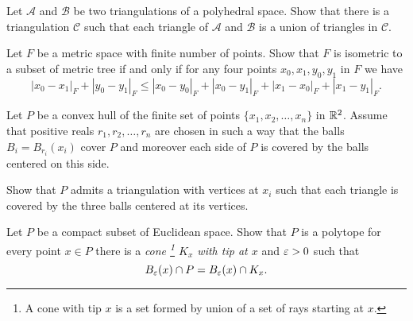 \begin{pr}\label{pr:2-triangulations}
Let $\mathcal{A}$ and $\mathcal{B}$ be two triangulations of a polyhedral space.
Show that there is a triangulation $\mathcal{C}$ such that each triangle of $\mathcal{A}$ and $\mathcal{B}$ is a union of triangles in $\mathcal{C}$.
\end{pr}

\begin{pr}
Let $F$ be a metric space with finite number of points.
Show that $F$ is isometric to a subset of metric tree if and only if
for any four points $x_0,x_1,y_0,y_1$ in $F$
we have 
$$|x_0-x_1|_F+|y_0-y_1|_F
\le
|x_0-y_0|_F+|x_0-y_1|_F+|x_1-x_0|_F+|x_1-y_1|_F.$$

\end{pr}

\begin{pr}\label{pr:delaunay.triangulation}
Let $P$ be a convex hull of the finite set of points $\{x_1,x_2,\dots,x_n\}$ in $\mathbb{R}^2$.
Assume that positive reals $r_1,r_2,\dots,r_n$ are chosen in such a way that the balls 
$B_i=B_{r_i}(x_i)$ cover $P$
and moreover each side of $P$ is covered by the balls centered on this side.

Show that $P$ admits a triangulation with vertices at $x_i$ such that each triangle is covered by the three balls centered at its vertices. 
\end{pr}


\begin{pr}\label{pr:polytope=local.cone}
Let $P$ be a compact subset of Euclidean space.
Show that $P$ is a polytope for every point $x\in P$
there is a \emph{cone%
\footnote{A cone with tip $x$ is a set formed by union of a set of rays starting at $x$.} $K_x$ with tip at $x$} and $\varepsilon>0$
such that 
$$B_\varepsilon(x)\cap P
=
B_\varepsilon(x)\cap K_x.$$
 
\end{pr}


